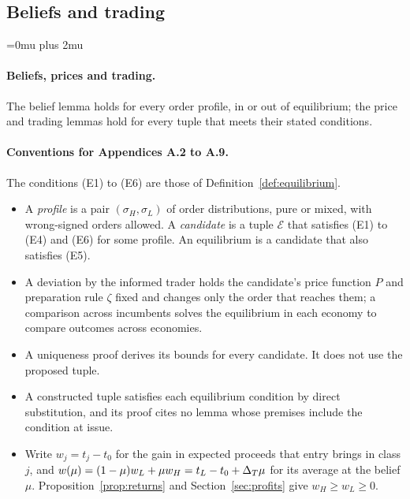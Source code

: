 \subsection{Beliefs and trading}\label{app:beliefs}

\Urlmuskip=0mu plus 2mu
\setlength{\emergencystretch}{1.5em}

\paragraph{Beliefs, prices and trading.}\label{par:a2-scope}
The belief lemma holds for every order profile, in or out of equilibrium; the price and trading lemmas hold
for every tuple that meets their stated conditions.

\paragraph{Conventions for Appendices A.2 to A.9.}
The conditions (E1) to (E6) are those of Definition~\ref{def:equilibrium}.
\begin{itemize}[leftmargin=2em]
\item A \emph{profile} is a pair \((\sigma_H,\sigma_L)\) of order distributions, pure or mixed, with wrong-signed
orders allowed. A \emph{candidate} is a tuple \(\mathcal E\) that satisfies (E1) to (E4) and (E6) for some
profile. An equilibrium is a candidate that also satisfies (E5).
\item A deviation by the informed trader holds the candidate's price function \(P\) and preparation rule \(\zeta\) fixed
and changes only the order that reaches them; a comparison across incumbents solves the equilibrium in each
economy to compare outcomes across economies.
\item A uniqueness proof derives its bounds for every candidate. It does not use the proposed tuple.
\item A constructed tuple satisfies each equilibrium condition by direct substitution, and its proof cites no lemma whose premises include the condition at issue.
\item Write \(w_j=t_j-t_0\) for the gain in expected proceeds that entry brings in class \(j\), and
\(w(\mu)=(1-\mu)w_L+\mu w_H=t_L-t_0+\Delta_T\mu\) for its average at the belief \(\mu\). Proposition~\ref{prop:returns}
and Section~\ref{sec:profits} give \(w_H\ge w_L\ge0\).
\end{itemize}

